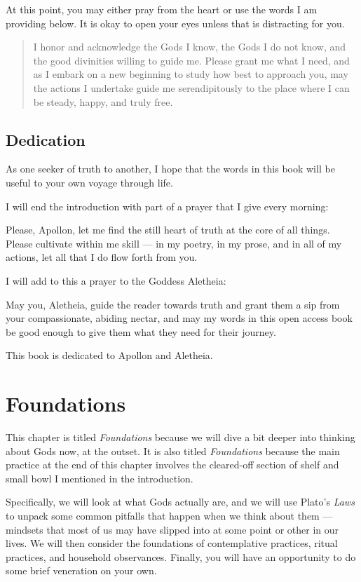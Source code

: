 \documentclass[
]{book}
\begin{document}
At this point, you may either pray from the heart or use the words I am providing below. It is okay to open your eyes unless that is distracting for you.

\begin{quote}
I honor and acknowledge the Gods I know, the Gods I do not know, and the good divinities willing to guide me. Please grant me what I need, and as I embark on a new beginning to study how best to approach you, may the actions I undertake guide me serendipitously to the place where I can be steady, happy, and truly free.
\end{quote}

\hypertarget{dedication}{%
\section{Dedication}\label{dedication}}

As one seeker of truth to another, I hope that the words in this book will be useful to your own voyage through life.

I will end the introduction with part of a prayer that I give every morning:

Please, Apollon, let me find the still heart of truth at the core of all things. Please cultivate within me skill --- in my poetry, in my prose, and in all of my actions, let all that I do flow forth from you.

I will add to this a prayer to the Goddess Aletheia:

May you, Aletheia, guide the reader towards truth and grant them a sip from your compassionate, abiding nectar, and may my words in this open access book be good enough to give them what they need for their journey.

This book is dedicated to Apollon and Aletheia.

\hypertarget{foundations}{%
\chapter{Foundations}\label{foundations}}

This chapter is titled \emph{Foundations} because we will dive a bit deeper into thinking about Gods now, at the outset. It is also titled \emph{Foundations} because the main practice at the end of this chapter involves the cleared-off section of shelf and small bowl I mentioned in the introduction.

Specifically, we will look at what Gods actually are, and we will use Plato's \emph{Laws} to unpack some common pitfalls that happen when we think about them --- mindsets that most of us may have slipped into at some point or other in our lives. We will then consider the foundations of contemplative practices, ritual practices, and household observances. Finally, you will have an opportunity to do some brief veneration on your own.
\end{document}
